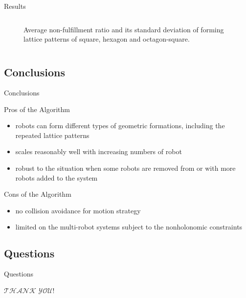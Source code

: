 \documentclass[10pt]{beamer}
\begin{document}
\begin{frame}{Results}{}
\begin{columns}[T]
\begin{column}{.48\textwidth}
\begin{figure}
          \caption{Average non-fulfillment ratio and its standard
            deviation of forming lattice patterns of square, hexagon
            and octagon-square.}
        \end{figure}
      \end{column}%
    \end{columns}
\end{frame}

\subsection{Conclusions}
\begin{frame}{Conclusions}{}
\begin{block}{Pros of the Algorithm}
  \begin{itemize}
  \item robots can form different types of geometric formations,
including the repeated lattice patterns
  \item scales reasonably well with increasing numbers of robot
  \item robust to the situation when some robots are removed from or
with more robots added to the system
  \end{itemize}
\end{block}
\begin{block}{Cons of the Algorithm}
  \begin{itemize}
  \item no collision avoidance for motion strategy
  \item limited on the multi-robot systems subject to the nonholonomic
    constraints
  \end{itemize}
\end{block}
\end{frame}


\subsection{Questions}
\begin{frame}{Questions}{}
  \begin{center}
    \textcolor{scred}{\LARGE $\mathscr{THANK}$ $\mathscr{YOU}!$}
  \end{center}
\end{frame}
\end{document}
